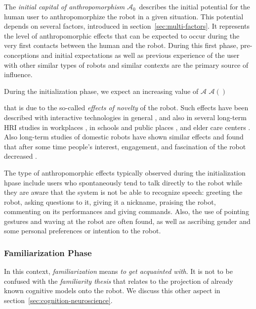\documentclass{frontiersSCNS} %
\newcommand{\Ant}[1][]{%
      \ifthenelse{\isempty{#1}}%
        {$\mathcal{A}$}
        {$\mathcal{A}(#1)$}
}
\newcommand{\ICA}{{$\mathcal{A}_0$~}}
\begin{document}
The \emph{initial capital of anthropomorphism} \ICA describes the initial potential
for the human user to anthropomorphize the robot in a given situation.
This potential depends on several factors, introduced in
section~\ref{sec:multi-factors}.
It represents the level of anthropomorphic effects that can be expected to occur
during the very first contacts between the human and the robot. During this first
phase, pre-conceptions and initial expectations as well as previous experience
of the user with other similar types of robots and similar contexts are the
primary source of influence.

During the initialization phase, we expect an increasing value of \Ant
that is due to the so-called \textit{effects of novelty} of the
robot. Such effects have been described with interactive technologies in general
\citep{rogers_diffusion_1995}, and also in several long-term HRI studies in
workplaces \citep{huttenrauch_fetch-and-carry_2003,mutlu_robots_2008}, in
schools and public places
\citep{gockley_designing_2005,kanda_communication_2005,kanda_interactive_2004},
and elder care centers \citep{sabelli_conversational_2011}. Also long-term
studies of domestic robots have shown similar effects and found that after some
time people's interest, engagement, and fascination of the robot decreased
\citep{sung_robots_2009,sung_domestic_2010,fernaeus_how_2010,fink_living_2013}.

The type of anthropomorphic effects typically observed during the initialization
hpase include users who spontaneously tend to talk directly to the robot while
they are aware that the system is not be able to recognize speech: greeting the
robot, asking questions to it, giving it a nickname, praising the robot,
commenting on its performances and giving commands. Also, the use of pointing
gestures and waving at the robot are often found, as well as ascribing gender
and some personal preferences or intention to the robot.

\subsubsection{Familiarization Phase\\}

In this context, \emph{familiarization} means \emph{to get acquainted with}.
It is not to be confused with the \emph{familiarity thesis} that relates to the
projection of already known cognitive models onto the robot. We discuss this other
aspect in section~\ref{sec:cognition-neuroscience}.
\end{document}
